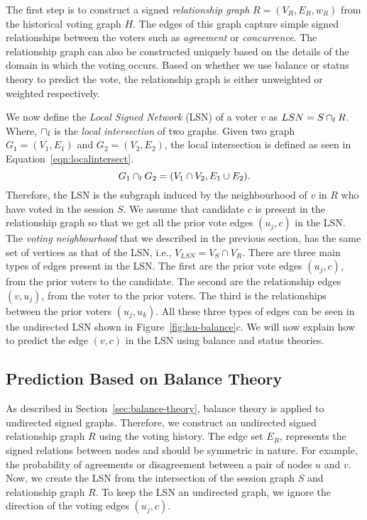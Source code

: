 The first step is to construct a signed \textit{relationship graph} $R=(V_R,E_R,w_R)$ from the historical voting graph $H$.
The edges of this graph capture simple signed relationships between the voters such as \textit{agreement} or \textit{concurrence}.
The relationship graph can also be constructed uniquely based on the details of the domain in which the voting occurs.
Based on whether we use balance or status theory to predict the vote, the relationship graph is either unweighted or weighted respectively.

We now define the \textit{Local Signed Network} (LSN) of a voter $v$ as $LSN = S \cap_{l} R$.
Where, $\cap_{l}$ is the \textit{local intersection} of two graphs.
Given two graph $G_1=(V_1,E_1)$ and $G_2=(V_2,E_2)$, the local intersection is defined as seen in Equation~\eqref{eqn:localintersect}.
\begin{equation}
    \label{eqn:localintersect}
    G_1 \cap_{l} G_2 = (V_1 \cap V_2,E_1\cup E_2).
\end{equation}
Therefore, the LSN is the subgraph induced by the neighbourhood of $v$ in $R$ who have voted in the session $S$.
We assume that candidate $c$ is present in the relationship graph so that we get all the prior vote edges $(u_j,c)$ in the LSN.
The \textit{voting neighbourhood} that we described in the previous section, has the same set of vertices as that of the LSN, i.e., $V_{LSN}=V_S \cap V_R$.
There are three main types of edges present in the LSN.
The first are the prior vote edges $(u_j,c)$, from the prior voters to the candidate.
The second are the relationship edges $(v,u_j)$, from the voter to the prior voters.
The third is the relationships between the prior voters $(u_j,u_k)$.
All these three types of edges can be seen in the undirected LSN shown in Figure~\ref{fig:lsn-balance}c.
We will now explain how to predict the edge $(v,c)$ in the LSN using balance and status theories.  

\subsection{Prediction Based on Balance Theory}
\label{subsec:prediction-based-balance}
As described in Section~\ref{sec:balance-theory}, balance theory is applied to undirected signed graphs.
Therefore, we construct an undirected signed relationship graph $R$ using the voting history.
The edge set $E_{R}$, represents the signed relations between nodes and should be symmetric in nature.
For example, the probability of agreements or disagreement between a pair of nodes $u$ and $v$.
Now, we create the LSN from the intersection of the session graph $S$ and relationship graph $R$.
To keep the LSN an undirected graph, we ignore the direction of the voting edges $(u_j,c)$. 

